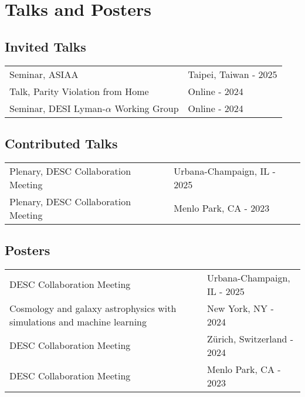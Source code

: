 \documentclass[a4paper,12pt]{article}
\begin{document}
\section{Talks and Posters}
\begin{adjustwidth}{2.0cm}{}
	\subsection*{\hspace{-2cm}Invited Talks}
	\begin{tabularx}{\linewidth}{@{}l X@{}}	
		Seminar, ASIAA & \hfill Taipei, Taiwan - 2025 \\
		Talk, Parity Violation from Home & \hfill  Online - 2024 \\
		Seminar, DESI Lyman-$\alpha$ Working Group & \hfill Online - 2024 \\
	\end{tabularx}
\end{adjustwidth}

\begin{adjustwidth}{2.0cm}{}
	\subsection*{\hspace{-2cm}Contributed Talks}
	\begin{tabularx}{\linewidth}{@{}l X@{}}	
		Plenary, DESC Collaboration Meeting & \hfill Urbana-Champaign, IL - 2025 \\
		Plenary, DESC Collaboration Meeting & \hfill Menlo Park, CA - 2023 \\
	\end{tabularx}
\end{adjustwidth}

\begin{adjustwidth}{2.0cm}{}
	\subsection*{\hspace{-2cm}Posters}
	\begin{tabularx}{\linewidth}{X X}	
		DESC Collaboration Meeting & \hfill Urbana-Champaign, IL - 2025 \\
		Cosmology and galaxy astrophysics with simulations and machine learning &  \hfill New York, NY - 2024 \\
		DESC Collaboration Meeting & \hfill Z\"urich, Switzerland - 2024 \\
		DESC Collaboration Meeting & \hfill Menlo Park, CA - 2023 \\
	\end{tabularx}
\end{adjustwidth}
\end{document}
